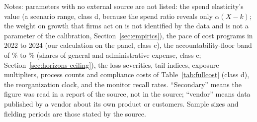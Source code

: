 \par\smallskip\noindent
Notes: parameters with no external source are not listed: the spend elasticity's value (a scenario range, class d, because the spend ratio reveals only $\alpha(X-k)$; the weight on growth that firms act on is not identified by the data and is not a parameter of the calibration, Section~\ref{sec:empirics}), the pace of cost programs in 2022 to 2024 (our calculation on the panel, class c), the accountability-floor band of \AminLo\% to \AminHi\% (shares of general and administrative expense, class c; Section~\ref{sec:horizons-ceiling}), the loss severities, tail indices, exposure multipliers, process counts and compliance costs of Table~\ref{tab:fullcost} (class d), the reorganization clock, and the monitor recall rates. ``Secondary'' means the figure was read in a report of the source, not in the source; ``vendor'' means data published by a vendor about its own product or customers. Sample sizes and fielding periods are those stated by the source.
\par
\endgroup
